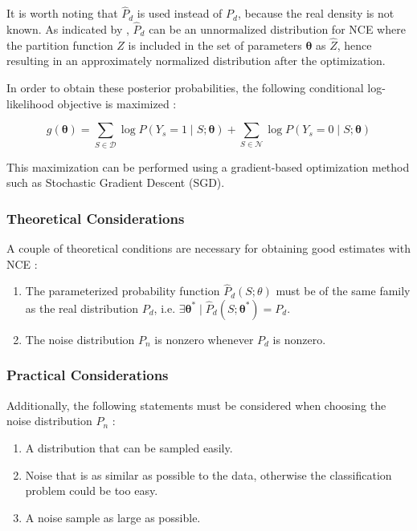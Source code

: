 It is worth noting that $\hat{P}_{d}$ is used instead of $P_{d}$, because the real density is not known. As indicated by \citet{Gutmann12NCE}, $\hat{P}_{d}$ can be an unnormalized distribution for NCE where the partition function $Z$ is included in the set of parameters $\boldsymbol{\theta}$ as $\hat{Z}$, hence resulting in an approximately normalized distribution after the optimization.

In order to obtain these posterior probabilities, the following conditional log-likelihood objective is maximized \citep{Gutmann12NCE}:

\begin{equation}
\label{eq:log-likelihood}
g(\boldsymbol{\theta}) = \sum_{S \in \mathcal{D}}{\log{P(Y_{s} = 1 \mid S;\boldsymbol{\theta})}} + \sum_{S \in \mathcal{N}}{\log{P(Y_{s} = 0 \mid S;\boldsymbol{\theta})}}
\end{equation}

This maximization can be performed using a gradient-based optimization method such as Stochastic Gradient Descent (SGD).

\subsubsection{Theoretical Considerations}
\label{sec:nce-theoretical}

A couple of theoretical conditions are necessary for obtaining good estimates with NCE \citep{Gutmann12NCE}:

\begin{enumerate}
  \item The parameterized probability function $\hat{P}_{d}(S;\theta)$ must be of the same family as the real distribution $P_{d}$, i.e. $\exists \boldsymbol{\theta}^{*} \mid \hat{P}_{d}(S;\boldsymbol{\theta}^{*}) = P_{d}$.
  \item The noise distribution $P_{n}$ is nonzero whenever $P_{d}$ is nonzero.
\end{enumerate}

\subsubsection{Practical Considerations}
\label{sec:nce-practical}

Additionally, the following statements must be considered when choosing the noise distribution $P_{n}$ \citep{Gutmann12NCE}:

\begin{enumerate}
  \item A distribution that can be sampled easily.
  \item Noise that is as similar as possible to the data, otherwise the classification problem could be too easy.
  \item A noise sample as large as possible.
\end{enumerate}

